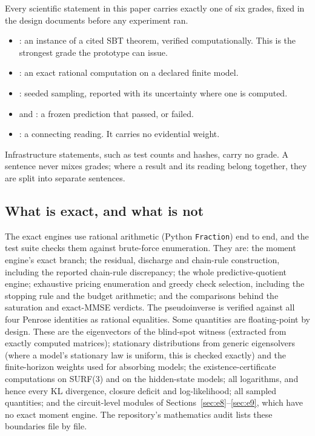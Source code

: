 Every scientific statement in this paper carries exactly one of six grades, fixed in the design documents before any experiment ran.
\begin{itemize}[nosep]
\item \gTheorem: an instance of a cited SBT theorem, verified computationally. This is the strongest grade the prototype can issue.
\item \gExact: an exact rational computation on a declared finite model.
\item \gMeasured: seeded sampling, reported with its uncertainty where one is computed.
\item \gRegPos{} and \gRegNeg: a frozen prediction that passed, or failed.
\item \gInterp: a connecting reading. It carries no evidential weight.
\end{itemize}
Infrastructure statements, such as test counts and hashes, carry no grade. A sentence never mixes grades; where a result and its reading belong together, they are split into separate sentences.

\subsection{What is exact, and what is not}
\label{sec:methods-exact}

The exact engines use rational arithmetic (Python \texttt{Fraction}) end to end, and the test suite checks them against brute-force enumeration. They are: the moment engine's exact branch; the residual, discharge and chain-rule construction, including the reported chain-rule discrepancy; the whole predictive-quotient engine; exhaustive pricing enumeration and greedy check selection, including the stopping rule and the budget arithmetic; and the comparisons behind the saturation and exact-MMSE verdicts. The pseudoinverse is verified against all four Penrose identities as rational equalities. %
Some quantities are floating-point by design. These are the eigenvectors of the blind-spot witness (extracted from exactly computed matrices); stationary distributions from generic eigensolvers (where a model's stationary law is uniform, this is checked exactly) and the finite-horizon weights used for absorbing models; the existence-certificate computations on SURF(3) and on the hidden-state models; all logarithms, and hence every KL divergence, closure deficit and log-likelihood; all sampled quantities; and the circuit-level modules of Sections~\ref{sec:e8}--\ref{sec:e9}, which have no exact moment engine. The repository's mathematics audit lists these boundaries file by file. %

